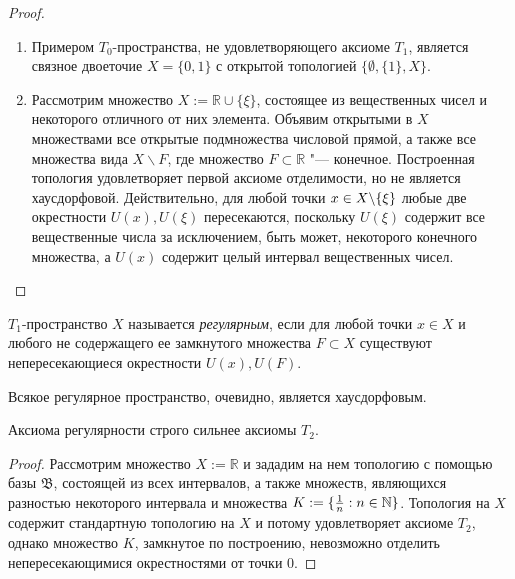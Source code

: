 \begin{proof}~
    \begin{enumerate}
        \item Примером $T_0$-пространства, не удовлетворяющего аксиоме $T_1$, является связное двоеточие $X = \{0, 1\}$ с открытой топологией $\lbrace \emptyset, \lbrace 1\rbrace, X\}$.
        
        \item Рассмотрим множество $X := \mathbb R \cup \lbrace \xi\rbrace$, состоящее из вещественных чисел и некоторого отличного от них элемента. Объявим открытыми в $X$ множествами все открытые подмножества числовой прямой, а также все множества вида $X \backslash F$, где множество $F \subset \mathbb R$ "--- конечное. Построенная топология удовлетворяет первой аксиоме отделимости, но не является
        хаусдорфовой. Действительно, для любой точки $x \in X \backslash \{\xi\}$ любые две окрестности $U(x), U(\xi)$ пересекаются, поскольку $U(\xi)$ содержит все вещественные числа за исключением, быть может, некоторого конечного множества, а $U(x)$ содержит целый интервал вещественных чисел.\qedhere
    \end{enumerate}
\end{proof}

\begin{definition}
    $T_1$-пространство $X$ называется \textit{регулярным}, если для любой точки $x \in X$ и любого не содержащего ее замкнутого множества $F \subset X$ существуют непересекающиеся окрестности $U(x), U(F)$.
\end{definition}

\begin{note}
    Всякое регулярное пространство, очевидно, является хаусдорфовым.
\end{note}

\begin{proposition}
    Аксиома регулярности строго сильнее аксиомы $T_2$.
\end{proposition}

\begin{proof}
    Рассмотрим множество $X := \mathbb R$ и зададим на нем топологию с помощью базы $\mathfrak{B}$, состоящей из всех интервалов, а также множеств, являющихся разностью некоторого интервала и множества $K := \{\frac 1n: n \in \mathbb{N}\}$. Топология на $X$ содержит стандартную топологию на $X$ и потому удовлетворяет аксиоме $T_2$, однако множество $K$, замкнутое по построению, невозможно отделить непересекающимися окрестностями от точки $0$.
\end{proof}

